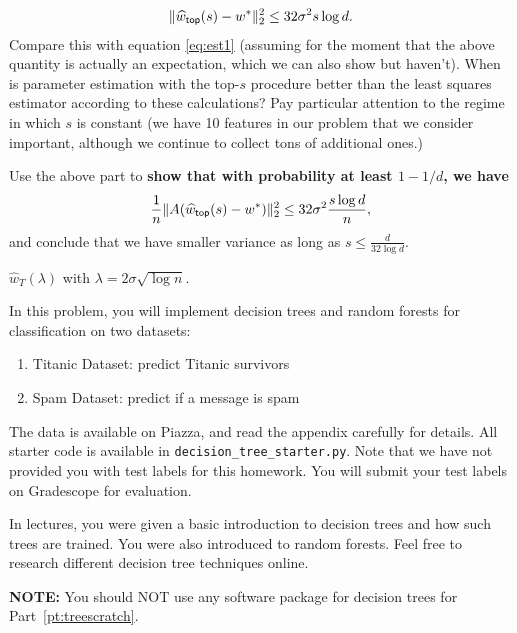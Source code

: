\begin{Parts}
\begin{align*}
\| \widehat{w}_{{\sf top}}(s) - w^* \|_2^2 \leq 32 \sigma^2 s\log d.
\end{align*}
Compare this with equation \eqref{eq:est1} (assuming for the moment that the above quantity is actually an expectation, which we can also show but haven't). When is parameter estimation with the top-$s$ procedure better than the least squares estimator according to these calculations? Pay particular attention to the regime in which $s$ is constant (we have 10 features in our problem that we consider important, although we continue to collect tons of additional ones.) 



\Part Use the above part to {\bf show that with probability at least $1 - 1/d$, we have}
\begin{align*}
\frac{1}{n} \| A (\widehat{w}_{{\sf top}}(s) - w^*) \|_2^2 \leq 32 \sigma^2 \frac{s \log d}{n},
\end{align*}
and conclude that we have smaller variance as long as $s \leq \frac{d}{32 \log d}$.



 $\widehat{w}_{T}(\lambda)$ with $\lambda = 2 \sigma \sqrt{\log n}$.



\end{Parts}

In this problem, you will implement decision trees and random forests for classification on two datasets:
\begin{enumerate}
	\item Titanic Dataset: predict Titanic survivors
	\item Spam Dataset: predict if a message is spam
\end{enumerate}
The data is available on Piazza, and read the appendix carefully for details. All starter code is available in \texttt{decision\_tree\_starter.py}. Note that we have not provided you with test labels for this homework. You will submit your test labels on Gradescope for evaluation.

In lectures, you were given a basic introduction to decision trees and how such trees are trained. You were also introduced to random forests. Feel free to research different decision tree techniques online.

\textbf{NOTE:} You should NOT use any software package for decision trees for Part~\ref{pt:treescratch}.

